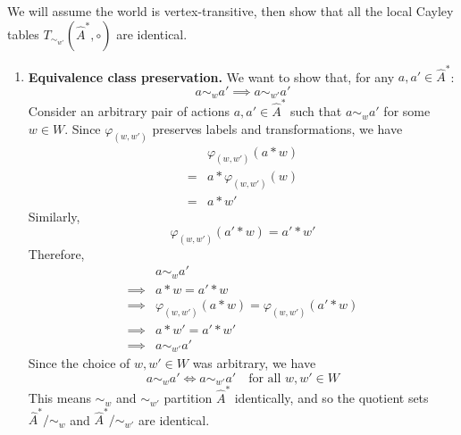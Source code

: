 \begin{proofE}
We will assume the world is vertex-transitive, then show that all the local Cayley tables $T_{\sim_{w'}}(\hat{A}^{*}, \circ)$ are identical.
\begin{enumerate}
    \item \textbf{Equivalence class preservation.}
    We want to show that, for any $a, a' \in \hat{A}^{*}$:
    \begin{equation}
        a \sim_{w} a' \implies a \sim_{w'} a'
    \end{equation}
    Consider an arbitrary pair of actions $a, a' \in \hat{A}^{*}$ such that $a \sim_{w} a'$ for some $w \in W$.
    Since $\varphi_{(w,w')}$ preserves labels and transformations, we have
    \begin{align}
        & \varphi_{(w,w')}(a \ast w) \\
        = & a \ast \varphi_{(w,w')}(w) \\
        = & a \ast w'
    \end{align}
    Similarly,
    \begin{equation}
        \varphi_{(w,w')}(a' \ast w) = a' \ast w'
    \end{equation}
    Therefore,
    \begin{align}
        & a \sim_{w} a' \\
        \implies & a \ast w = a' \ast w \\
        \implies & \varphi_{(w,w')}(a \ast w) = \varphi_{(w,w')}(a' \ast w) \\
        \implies & a \ast w' = a' \ast w' \\
        \implies & a \sim_{w'} a'
    \end{align}
    Since the choice of $w, w' \in W$ was arbitrary, we have
    \begin{equation}
        a \sim_{w} a' \iff a \sim_{w'} a' \quad \text{for all $w, w' \in W$}
    \end{equation}
    This means $\sim_{w}$ and $\sim_{w'}$ partition $\hat{A}^{*}$ identically, and so the quotient sets $\hat{A}^{*}/\sim_{w}$ and $\hat{A}^{*}/\sim_{w'}$ are identical.


\end{enumerate}
\end{proofE}
